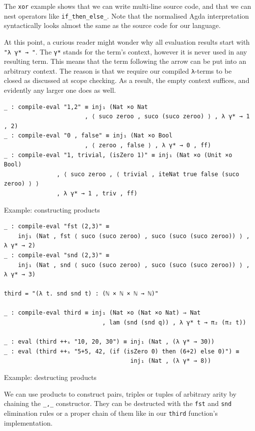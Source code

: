 The \verb$xor$ example shows that we can write multi-line source code, and that we can nest operators like \verb$if_then_else_$. Note that the normalised Agda interpretation syntactically looks almost the same as the source code for our language.

At this point, a curious reader might wonder why all evaluation results start with \verb$"λ γ* → "$. The \verb$γ*$ stands for the term's context, however it is never used in any resulting term. This means that the term following the arrow can be put into an arbitrary context. The reason is that we require our compiled \verb$λ$-terms to be closed as discussed at scope checking. As a result, the empty context suffices, and evidently any larger one does as well.

\begin{listing}[H]
\begin{verbatim}
_ : compile-eval "1,2" ≡ inj₁ (Nat ×o Nat
                       , ⟨ suco zeroo , suco (suco zeroo) ⟩ , λ γ* → 1 , 2)
_ : compile-eval "0 , false" ≡ inj₁ (Nat ×o Bool
                       , ⟨ zeroo , false ⟩ , λ γ* → 0 , ff)
_ : compile-eval "1, trivial, (isZero 1)" ≡ inj₁ (Nat ×o (Unit ×o Bool)
               , ⟨ suco zeroo , ⟨ trivial , iteNat true false (suco zeroo) ⟩ ⟩
               , λ γ* → 1 , triv , ff)
\end{verbatim}
\caption{Example: constructing products}
\label{code:examples-prod-con}
\end{listing}

\begin{listing}[H]
\begin{verbatim}
_ : compile-eval "fst (2,3)" ≡
    inj₁ (Nat , fst ⟨ suco (suco zeroo) , suco (suco (suco zeroo)) ⟩ , λ γ* → 2)
_ : compile-eval "snd (2,3)" ≡
    inj₁ (Nat , snd ⟨ suco (suco zeroo) , suco (suco (suco zeroo)) ⟩ , λ γ* → 3)

third = "(λ t. snd snd t) : (ℕ × ℕ × ℕ → ℕ)"

_ : compile-eval third ≡ inj₁ (Nat ×o (Nat ×o Nat) ⇒ Nat
                            , lam (snd (snd q)) , λ γ* t → π₂ (π₂ t))

_ : eval (third ++ₛ "10, 20, 30") ≡ inj₁ (Nat , (λ γ* → 30))
_ : eval (third ++ₛ "5+5, 42, (if (isZero 0) then (6+2) else 0)") ≡
                                    inj₁ (Nat , (λ γ* → 8))
\end{verbatim}
\caption{Example: destructing products}
\label{code:examples-prod-des}
\end{listing}

We can use products to construct pairs, triples or tuples of arbitrary arity by chaining the \verb$_,_$ constructor. They can be destructed with the \verb$fst$ and \verb$snd$ elimination rules or a proper chain of them like in our \verb$third$ function's implementation.

